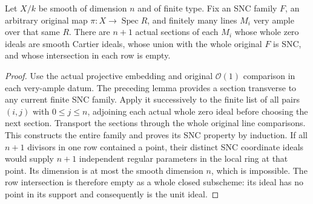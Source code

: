 \begin{theorem}
\label{thm:kn-relative-nadel-auxiliary-family}
\leanok
{}
Let $X/k$ be smooth of dimension $n$ and of finite type.  Fix an SNC
family $F$, an arbitrary original map $\pi:X\to\operatorname{Spec}R$,
and finitely many lines $M_i$ very ample over that same $R$.  There are
$n+1$ actual sections of each $M_i$ whose whole zero ideals are smooth
Cartier ideals, whose union with the whole original $F$ is SNC, and whose
intersection in each row is empty.
\end{theorem}
\begin{proof}
Use the actual projective embedding and original $\mathcal O(1)$
comparison in each very-ample datum.  The preceding lemma provides a
section transverse to any current finite SNC family.  Apply it
successively to the finite list of all pairs $(i,j)$ with
$0\leq j\leq n$, adjoining each actual whole zero ideal before choosing
the next section.  Transport the sections through the whole original
line comparisons.  This constructs the entire family and proves its
SNC property by induction.  If all $n+1$ divisors in one row contained
a point, their distinct SNC coordinate ideals would supply $n+1$
independent regular parameters in the local ring at that point.  Its
dimension is at most the smooth dimension $n$, which is impossible.
The row intersection is therefore empty as a whole closed subscheme:
its ideal has no point in its support and consequently is the unit ideal.
\end{proof}

